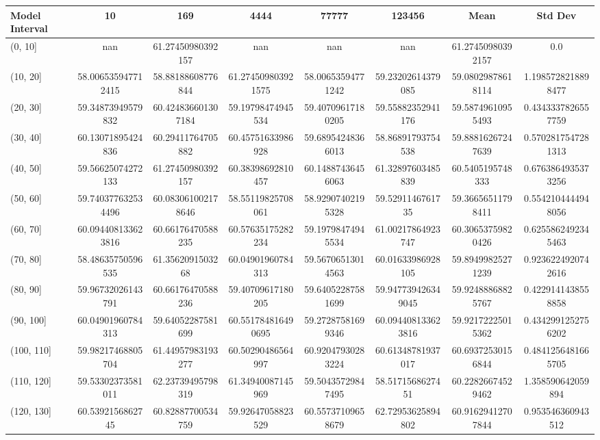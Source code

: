\begin{table}[H]
\centering
\begin{tabular}{|l |c |c |c |c |c |c |c|}
\hline
Model Interval & 10 & 169 & 4444 & 77777 & 123456 & Mean & Std Dev \\
\hline
(0, 10] & nan & 61.27450980392157 & nan & nan & nan & 61.27450980392157 & 0.0 \\
(10, 20] & 58.006535947712415 & 58.88188608776844 & 61.274509803921575 & 58.00653594771242 & 59.23202614379085 & 59.08029878618114 & 1.1985728218898477 \\
(20, 30] & 59.34873949579832 & 60.424836601307184 & 59.19798474945534 & 59.40709617180205 & 59.55882352941176 & 59.58749610955493 & 0.4343337826557759 \\
(30, 40] & 60.13071895424836 & 60.29411764705882 & 60.45751633986928 & 59.68954248366013 & 58.86891793754538 & 59.88816267247639 & 0.5702817547281313 \\
(40, 50] & 59.56625074272133 & 61.27450980392157 & 60.38398692810457 & 60.14887436456063 & 61.32897603485839 & 60.5405195748333 & 0.6763864935373256 \\
(50, 60] & 59.740377632534496 & 60.083061002178646 & 58.55119825708061 & 58.92907402195328 & 59.5291146761735 & 59.36656511798411 & 0.5542104444948056 \\
(60, 70] & 60.094408133623816 & 60.66176470588235 & 60.57635175282234 & 59.19798474945534 & 61.00217864923747 & 60.30653759820426 & 0.6255862492345463 \\
(70, 80] & 58.48635750596535 & 61.3562091503268 & 60.04901960784313 & 59.56706513014563 & 60.01633986928105 & 59.89499825271239 & 0.9236224920742616 \\
(80, 90] & 59.96732026143791 & 60.66176470588236 & 59.40709617180205 & 59.64052287581699 & 59.947739426349045 & 59.92488868825767 & 0.4229141438558858 \\
(90, 100] & 60.04901960784313 & 59.64052287581699 & 60.551784816490695 & 59.27287581699346 & 60.094408133623816 & 59.92172225015362 & 0.4342991252756202 \\
(100, 110] & 59.98217468805704 & 61.44957983193277 & 60.50290486564997 & 60.92047930283224 & 60.61348781937017 & 60.69372530156844 & 0.4841256481665705 \\
(110, 120] & 59.53302373581011 & 62.23739495798319 & 61.34940087145969 & 59.50435729847495 & 58.5171568627451 & 60.22826674529462 & 1.358590642059894 \\
(120, 130] & 60.5392156862745 & 60.82887700534759 & 59.92647058823529 & 60.55737109658679 & 62.72953625894802 & 60.91629412707844 & 0.953546360943512 \\

\end{tabular}
\end{table}
